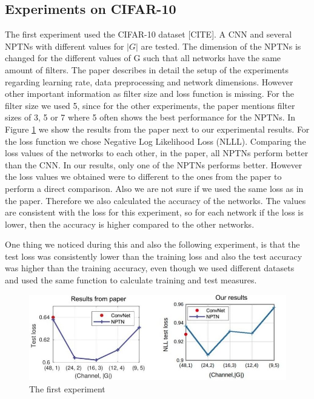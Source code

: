 \documentclass{llncs}
\begin{document}
\subsection{Experiments on CIFAR-10}
The first experiment used the CIFAR-10 dataset [CITE]. A CNN and several NPTNs with different values for $|G|$ are tested. The dimension of the NPTNs is changed for the different values of G such that all networks have the same amount of filters.
The paper describes in detail the setup of the experiments regarding learning rate, data preprocessing and network dimensions. However other important information as filter size and loss function is missing. 
For the filter size we used 5, since for the other experiments, the paper mentions  filter sizes of 3, 5 or 7 where 5 often shows the best performance for the NPTNs. 
In Figure \ref{pic:first_experiment} we show the results from the paper next to our experimental results. For the loss function we chose Negative Log Likelihood Loss (NLLL). 
Comparing the loss values of the networks to each other, in the paper, all NPTNs perform better than the CNN. In our results, only one of the NPTNs performs better.
However the loss values we obtained were to different to the ones from the paper to perform a direct comparison. 
Also we are not sure if we used the same loss as in the paper.  Therefore we also calculated the accuracy of the networks. The values are consistent with the loss for this experiment, so for each network if the loss is lower, then the accuracy is higher compared to the other networks.

One thing we noticed during this and also the following experiment, is that the test loss was consistently lower than the training loss and also the test accuracy was higher than the training accuracy, even though we used different datasets and used the same function to calculate training and test measures.

\begin{figure}
	\begin{center}
	\includegraphics[scale=0.35]{result_images/experiment1.jpg}
	\caption{The first experiment}
	\label{pic:first_experiment}
	\end{center}
\end{figure}
\end{document}
